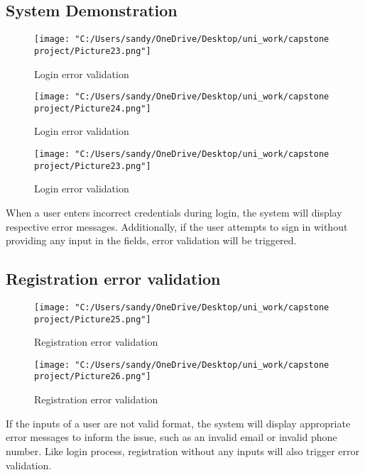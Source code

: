 \documentclass[12pt]{article}
\begin{document}
\subsection{System Demonstration}
\begin{figure}[H]
	\centering
	\texttt{[image: "C:/Users/sandy/OneDrive/Desktop/uni\_work/capstone project/Picture23.png"]}
	\caption{Login error validation}
	
\end{figure}
\begin{figure}[H]
	\centering
	\texttt{[image: "C:/Users/sandy/OneDrive/Desktop/uni\_work/capstone project/Picture24.png"]}
	\caption{Login error validation}
	
\end{figure}
\begin{figure}[H]
	\centering
	\texttt{[image: "C:/Users/sandy/OneDrive/Desktop/uni\_work/capstone project/Picture23.png"]}
	\caption{Login error validation}
	
\end{figure}
When a user enters incorrect credentials during login, the system will display respective error messages. Additionally, if the user attempts to sign in without providing any input in the fields, error validation will be triggered.

\subsection{Registration error validation}
\begin{figure}[H]
	\centering
	\texttt{[image: "C:/Users/sandy/OneDrive/Desktop/uni\_work/capstone project/Picture25.png"]}
	\caption{Registration error validation}
	
\end{figure}
\begin{figure}[H]
	\centering
	\texttt{[image: "C:/Users/sandy/OneDrive/Desktop/uni\_work/capstone project/Picture26.png"]}
	\caption{Registration error validation}
	
\end{figure}
If the inputs of a user are not valid format, the system will display appropriate error messages to inform the issue, such as an invalid email or invalid phone number. Like login process, registration without any inputs will also trigger error validation.
\end{document}
